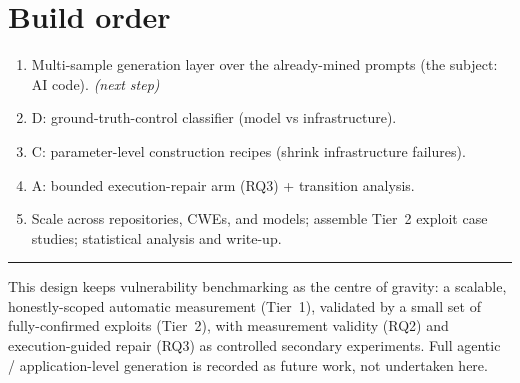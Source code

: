 \documentclass[11pt]{article}
\begin{document}
\section{Build order}

\begin{enumerate}[leftmargin=1.6em,itemsep=1pt,topsep=2pt]
  \item Multi-sample generation layer over the already-mined prompts
  (the subject: AI code). \emph{(next step)}
  \item D: ground-truth-control classifier (model vs infrastructure).
  \item C: parameter-level construction recipes (shrink infrastructure
  failures).
  \item A: bounded execution-repair arm (RQ3) + transition analysis.
  \item Scale across repositories, CWEs, and models; assemble Tier~2
  exploit case studies; statistical analysis and write-up.
\end{enumerate}

\vspace{6pt}
\hrule
\vspace{4pt}
{\small This design keeps vulnerability benchmarking as the centre of
gravity: a scalable, honestly-scoped automatic measurement (Tier~1),
validated by a small set of fully-confirmed exploits (Tier~2), with
measurement validity (RQ2) and execution-guided repair (RQ3) as controlled
secondary experiments. Full agentic / application-level generation is
recorded as future work, not undertaken here.}
\end{document}
